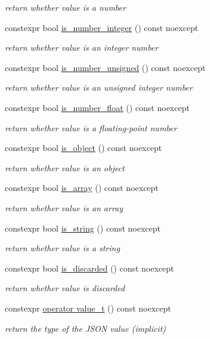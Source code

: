 \begin{DoxyCompactItemize}
\begin{DoxyCompactList}\small\item\em return whether value is a number \end{DoxyCompactList}\item 
constexpr bool \hyperlink{a00025_a87499fdb56ca6f0df2242c3335c3dc9b}{is\+\_\+number\+\_\+integer} () const  noexcept
\begin{DoxyCompactList}\small\item\em return whether value is an integer number \end{DoxyCompactList}\item 
constexpr bool \hyperlink{a00025_a693b411d9c5ad0d168a0013cfb80b8e5}{is\+\_\+number\+\_\+unsigned} () const  noexcept
\begin{DoxyCompactList}\small\item\em return whether value is an unsigned integer number \end{DoxyCompactList}\item 
constexpr bool \hyperlink{a00025_a628733b45cd0e32bd59efea149f40b4b}{is\+\_\+number\+\_\+float} () const  noexcept
\begin{DoxyCompactList}\small\item\em return whether value is a floating-\/point number \end{DoxyCompactList}\item 
constexpr bool \hyperlink{a00025_a0d96ff13001977a93d65f0a97279d316}{is\+\_\+object} () const  noexcept
\begin{DoxyCompactList}\small\item\em return whether value is an object \end{DoxyCompactList}\item 
constexpr bool \hyperlink{a00025_a1af360cb513cc32f28e80ddd0b9d7666}{is\+\_\+array} () const  noexcept
\begin{DoxyCompactList}\small\item\em return whether value is an array \end{DoxyCompactList}\item 
constexpr bool \hyperlink{a00025_ab22c8d61eca51f0308c263487bd35f03}{is\+\_\+string} () const  noexcept
\begin{DoxyCompactList}\small\item\em return whether value is a string \end{DoxyCompactList}\item 
constexpr bool \hyperlink{a00025_a66c051561828b2c4eeaad896a72bec99}{is\+\_\+discarded} () const  noexcept
\begin{DoxyCompactList}\small\item\em return whether value is discarded \end{DoxyCompactList}\item 
constexpr \hyperlink{a00025_a101cd941eb8a5c299660449c71d0e75e}{operator value\+\_\+t} () const  noexcept
\begin{DoxyCompactList}\small\item\em return the type of the J\+S\+ON value (implicit) \end{DoxyCompactList}\end{DoxyCompactItemize}
